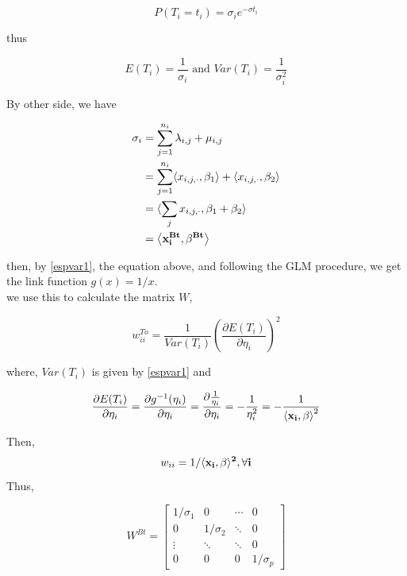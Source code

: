 	$$ P(T_i = t_i) = \sigma_i e^{-\sigma t_i} $$
	
thus 

\begin{equation}
E(T_i) = \frac{1}{\sigma_i}  \text{ and } Var(T_i) = \frac{1}{\sigma_i^2}
\label{espvar1}
\end{equation}


By other side, we have 


\begin{align*}
\sigma_i &= \displaystyle\sum_{j=1}^{n_i} \lambda_{i,j} + \mu_{i,j} \\
	     &= \displaystyle\sum_{j=1}^{n_i} \langle x_{i,j,\cdot}, \beta_1 \rangle + 				\langle x_{i,j,\cdot}, \beta_2 \rangle \\
	     &= \langle \sum_j x_{i,j,\cdot}, \beta_1 + \beta_2 \rangle \\ 
	     &= \left\langle \bf{x}_i^{Bt} , \beta^{Bt} \right\rangle 
\label{linear}
\end{align*}


%
then, by \ref{espvar1}, the equation above, and following the GLM procedure, we get the link function $g(x) = 1/x$. \\

we use this to calculate the matrix $W$, 

$$ w_{ii}^{To} = \frac{1}{Var(T_i)}\left( \frac{\partial E(T_i)}{\partial \eta_i} \right)^2 $$

where, $Var(T_i)$ is given by \ref{espvar1} and 

$$ \frac{\partial E(T_i)}{\partial \eta_i} = \frac{\partial g^{-1}(\eta_i)}{\partial \eta_i} = \frac{\partial \frac{1}{\eta_i}}{\partial \eta_i} = -\frac{1}{\eta_i^2} = -\frac{1}{\left\langle \bf{x}_i , \bf{\beta} \right\rangle ^2} $$ 

Then, $$w_{ii} = 1/\langle \bf{x}_i , \beta \rangle ^2, \forall i$$
Thus, 

\[
W^{Bt}=
  \begin{bmatrix}
    1/\sigma_1     &      0 & \cdots &  0 \\
     0     &     1/\sigma_2 & \ddots &  0 \\
    \vdots & \ddots & \ddots  & 0 \\
     0     &      0 & 0 &  1/\sigma_p 
  \end{bmatrix}
\]

